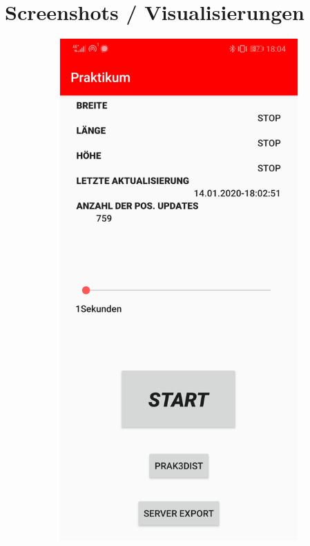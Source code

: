 \newpage
\section{Screenshots / Visualisierungen}

\begin{figure}[h!]
    \centering
    \begin{subfigure}[b]{0.35\textwidth}
        \includegraphics[width=\textwidth]{Screenshot_route1}

\end{subfigure}
\end{figure}
